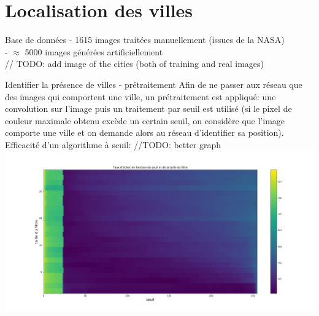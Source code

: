 \documentclass[ignorenonframetext,]{beamer}
\begin{document}
\section{Localisation des villes}
\frame{\sectionpage}
\begin{frame}{Base de données}
    - 1615 images traitées manuellement (issues de la NASA) \\
    - $\approx$ 5000 images générées artificiellement \\
    // TODO: add image of the cities (both of training and real images)
\end{frame}
\begin{frame}{Identifier la présence de villes - prétraitement}
    Afin de ne passer aux réseau que des images qui comportent une ville, un prétraitement est appliqué: une convolution sur l'image puis un traitement par seuil est utilisé (si le pixel de couleur maximale obtenu excède un certain seuil, on considère que l'image comporte une ville et on demande alors au réseau d'identifier sa position).
Efficacité d'un algorithme à seuil:
//TODO: better graph
\includegraphics{filtre_vs_seuil.png}
\end{frame}
\end{document}
